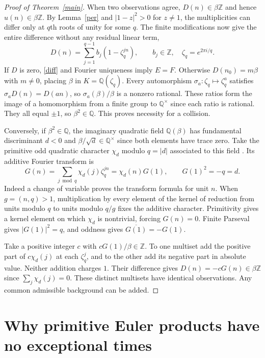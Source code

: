 \documentclass[11pt]{article}
\newcommand{\Z}{\mathbb Z}
\newcommand{\Q}{\mathbb Q}
\begin{document}
\begin{proof}[Proof of Theorem~\ref{main}]
When two observations agree, $D(n)\in\beta\Z$ and hence $u(n)\in\beta\Z$.
By Lemma~\ref{per} and $|1-z|^2>0$ for $z\ne1$, the multiplicities can
differ only at $q$th roots of unity for some $q$. The finite modifications
now give the entire difference without any residual linear term,
\[
 D(n)=\sum_{j=1}^{q-1}b_j(1-\zeta_q^{jn}),\qquad
 b_j\in\Z,\quad \zeta_q=e^{2\pi i/q}.
\]
If $D$ is zero, \eqref{diff} and Fourier uniqueness imply $E=F$.
Otherwise $D(n_0)=m\beta$ with $m\ne0$, placing $\beta$ in
$K=\Q(\zeta_q)$. Every automorphism $\sigma_a:\zeta_q\mapsto\zeta_q^a$
satisfies $\sigma_a D(n)=D(an)$, so $\sigma_a(\beta)/\beta$ is a
nonzero rational. These ratios form the image of a homomorphism from a
finite group to $\Q^\times$ since each ratio is rational. They all equal
$\pm1$, so $\beta^2\in\Q$. This proves necessity for a collision.

Conversely, if $\beta^2\in\Q$, the imaginary quadratic field
$\Q(\beta)$ has fundamental discriminant $d<0$ and
$\beta/\sqrt d\in\Q^\times$ since both elements have trace zero. Take
the primitive odd quadratic character $\chi_d$ modulo $q=|d|$ associated
to this field \cite{conrad}. Its additive Fourier transform is
\[
 G(n)=\sum_{j\bmod q}\chi_d(j)\zeta_q^{jn}
     =\chi_d(n)G(1),\qquad G(1)^2=-q=d .
\]
Indeed a change of variable proves the transform formula for unit $n$.
When $g=(n,q)>1$, multiplication by every element of the kernel of
reduction from units modulo $q$ to units modulo $q/g$ fixes the additive
character. Primitivity gives a kernel element on which $\chi_d$ is
nontrivial, forcing $G(n)=0$. Finite Parseval gives $|G(1)|^2=q$,
and oddness gives $\overline{G(1)}=-G(1)$.

Take a positive integer $c$ with $cG(1)/\beta\in\Z$. To one multiset
add the positive part of $c\chi_d(j)$ at each $\zeta_q^j$, and to the
other add its negative part in absolute value. Neither addition charges
$1$. Their difference gives $D(n)=-cG(n)\in\beta\Z$ since
$\sum_j\chi_d(j)=0$. These distinct multisets have identical
observations. Any common admissible background can be added.
\end{proof}

\section{Why primitive Euler products have no exceptional times}
\end{document}
